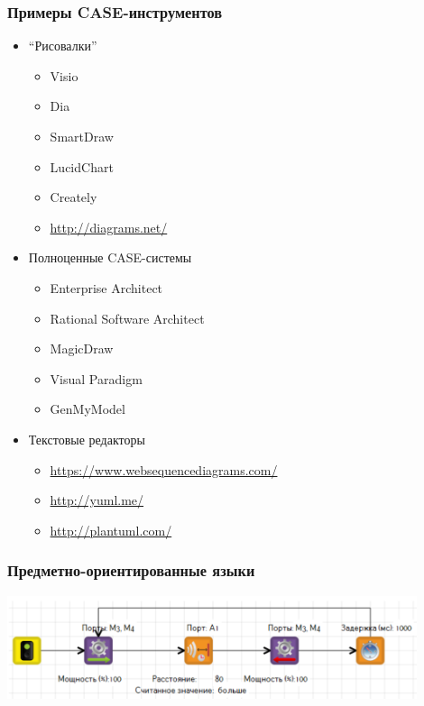 \documentclass{../../slides-style}
\begin{document}
    \begin{frame}
        \frametitle{Примеры CASE-инструментов}
        \begin{itemize}
            \item ``Рисовалки''
            \begin{itemize}
                \item Visio
                \item Dia
                \item SmartDraw
                \item LucidChart
                \item Creately
                \item \url{http://diagrams.net/}
            \end{itemize}
            \item Полноценные CASE-системы
            \begin{itemize}
                \item Enterprise Architect
                \item Rational Software Architect
                \item MagicDraw
                \item Visual Paradigm
                \item GenMyModel
            \end{itemize}
            \item Текстовые редакторы
            \begin{itemize}
                \item \url{https://www.websequencediagrams.com/}
                \item \url{http://yuml.me/}
                \item \url{http://plantuml.com/}
            \end{itemize}
        \end{itemize}
    \end{frame}

    \begin{frame}
        \frametitle{Предметно-ориентированные языки}
        \begin{center}
            \includegraphics[width=0.9\textwidth]{domainLanguages.png}
        \end{center}
    \end{frame}
\end{document}
